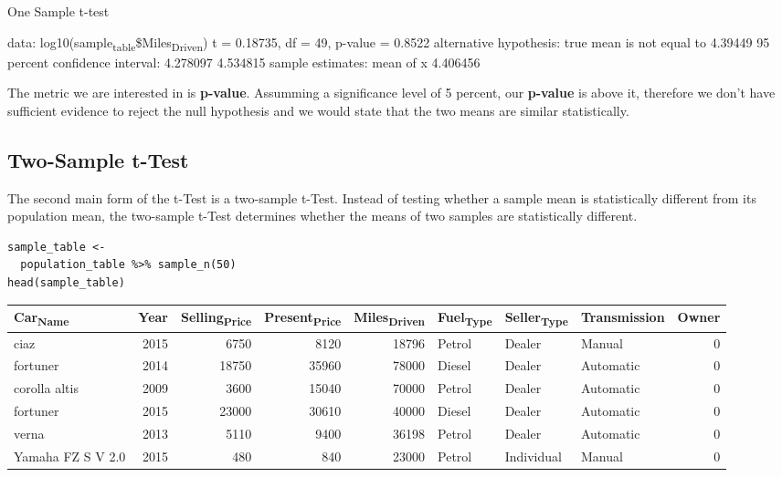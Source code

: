 \documentclass[11pt]{article}
\begin{document}
\begin{org}


One Sample t-test

data:  log10(sample\textsubscript{table}\$Miles\textsubscript{Driven})
t = 0.18735, df = 49, p-value = 0.8522
alternative hypothesis: true mean is not equal to 4.39449
95 percent confidence interval:
 4.278097 4.534815
sample estimates:
mean of x
 4.406456
\end{org}

The metric we are interested in is \textbf{p-value}. Assumming a significance level of 5 percent, our \textbf{p-value} is above it, therefore we don't have sufficient evidence to reject the null hypothesis and we would state that the two means are similar statistically.

\subsection{Two-Sample t-Test}
\label{sec:orgc1d19c1}

The second main form of the t-Test is a two-sample t-Test. Instead of testing whether a sample mean is statistically different from its population mean, the two-sample t-Test determines whether the means of two samples are statistically different.

\begin{verbatim}
sample_table <-
  population_table %>% sample_n(50)
head(sample_table)
\end{verbatim}

\begin{org}
\begin{center}
\begin{tabular}{lrrrrlllr}
Car\textsubscript{Name} & Year & Selling\textsubscript{Price} & Present\textsubscript{Price} & Miles\textsubscript{Driven} & Fuel\textsubscript{Type} & Seller\textsubscript{Type} & Transmission & Owner\\
\hline
ciaz & 2015 & 6750 & 8120 & 18796 & Petrol & Dealer & Manual & 0\\
fortuner & 2014 & 18750 & 35960 & 78000 & Diesel & Dealer & Automatic & 0\\
corolla altis & 2009 & 3600 & 15040 & 70000 & Petrol & Dealer & Automatic & 0\\
fortuner & 2015 & 23000 & 30610 & 40000 & Diesel & Dealer & Automatic & 0\\
verna & 2013 & 5110 & 9400 & 36198 & Petrol & Dealer & Automatic & 0\\
Yamaha FZ S V 2.0 & 2015 & 480 & 840 & 23000 & Petrol & Individual & Manual & 0\\
\end{tabular}
\end{center}
\end{org}
\end{document}

